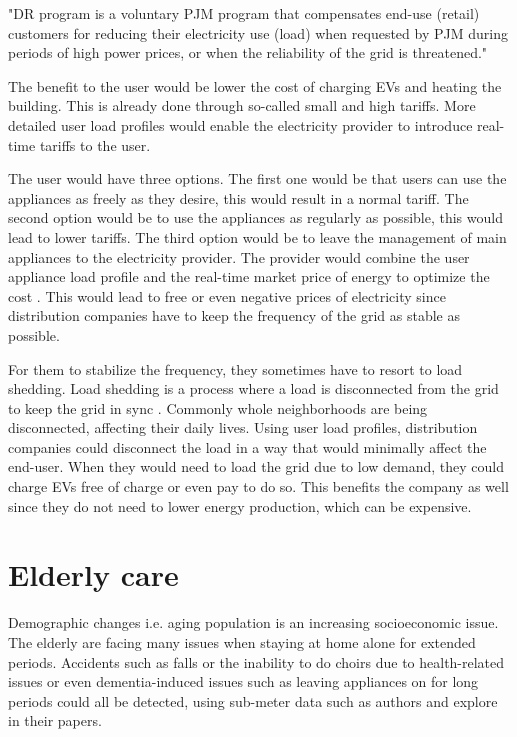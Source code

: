 \documentclass[
11pt, %
english, %
singlespacing, %
headsepline, %
]{MastersDoctoralThesis} %
\begin{document}
"DR program is a voluntary PJM program that compensates end-use (retail) customers for reducing their electricity use (load)
when requested by PJM during periods of high power prices, or when the reliability of the grid is threatened." \cite{DemandResponse2018}

The benefit to the user would be lower the cost of charging EVs and heating the building.
This is already done through so-called small and high tariffs.
More detailed user load profiles would enable the electricity provider to introduce real-time tariffs to the user.

The user would have three options. The first one would be that users can use the appliances as freely as they desire, this would result in a normal tariff.
The second option would be to use the appliances as regularly as possible, this would lead to lower tariffs.
The third option would be to leave the management of main appliances to the electricity provider.
The provider would combine the user appliance load profile and the real-time market price of energy to optimize the cost \cite{optimiseCostShift2015}.
This would lead to free or even negative prices of electricity since distribution companies have to keep the frequency of the grid as stable as possible.

For them to stabilize the frequency, they sometimes have to resort to load shedding.
Load shedding is a process where a load is disconnected from the grid to keep the grid in sync \cite{loadShedding2006}.
Commonly whole neighborhoods are being disconnected, affecting their daily lives.
Using user load profiles, distribution companies could disconnect the load in a way that would minimally affect the end-user. 
When they would need to load the grid due to low demand, they could charge EVs free of charge or even pay to do so. 
This benefits the company as well since they do not need to lower energy production, which can be expensive. 

\section{Elderly care}

Demographic changes i.e. aging population is an increasing socioeconomic issue.
The elderly are facing many issues when staying at home alone for extended periods.
Accidents such as falls or the inability to do choirs due to health-related issues or even dementia-induced issues 
such as leaving appliances on for long periods could all be detected, using sub-meter data such as authors \cite{elder1} and \cite{elder2}
explore in their papers.
\end{document}
